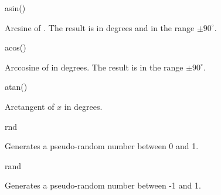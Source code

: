 \begin{math-function}{asin()}

	Arcsine of . The result is in degrees and in the range $\pm90^\circ$.

\begin{codeexample}[]
 \pgfmathresult
\end{codeexample}

\end{math-function}

\begin{math-function}{acos()}

	Arccosine of  in degrees. The result is in the range $\pm90^\circ$.


\begin{codeexample}[]
 \pgfmathresult
\end{codeexample}

\end{math-function}

\begin{math-function}{atan()}

	Arctangent of $x$ in degrees. 

\begin{codeexample}[]
 \pgfmathresult
\end{codeexample}

\end{math-function}

\begin{math-function}{rnd}

	Generates a pseudo-random number between 0 and 1.

\begin{codeexample}[]
 \pgfmathresult
\end{codeexample}

\begin{codeexample}[]
 \pgfmathresult
\end{codeexample}

\begin{codeexample}[]
 \pgfmathresult
\end{codeexample}

\end{math-function}

\begin{math-function}{rand}

	Generates a pseudo-random number between -1 and 1.

\begin{codeexample}[]
 \pgfmathresult
\end{codeexample}

\begin{codeexample}[]
 \pgfmathresult
\end{codeexample} 

\end{math-function}

